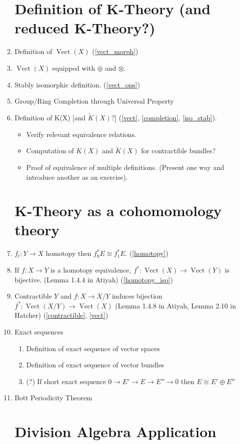\documentclass[12]{amsart}
\DeclareMathOperator{\vect}{Vect}
\begin{document}
\begin{enumerate}
    \section{Definition of K-Theory (and reduced K-Theory?)} %
    \item Definition of $\vect(X)$ (\ref{vect_morph}) \label{vect}
    \item $\vect(X)$ equipped with $\oplus$ and $\otimes$. \label{vect_ops} 
    \item Stably isomorphic definition. (\ref{vect_ops}) $\label{iso_stab}$
    \item Group/Ring Completion through Universal Property \label{completion}
    \item Definition of K(X) [and $\tilde{K}(X)$?] (\ref{vect}, \ref{completion}, \ref{iso_stab}).
    \begin{itemize}
        \item Verify relevant equivalence relations.
        \item Computation of $K(X)$ and $\tilde{K}(X)$ for contractible bundles?
        \item Proof of equivalence of multiple definitions. (Present one way and introduce another as an exercise).
    \end{itemize}

\section{K-Theory as a cohomomology theory}
    \item $f_t: Y \to X$ homotopy then $f_0^*E \cong f_1^*E$. \label{homotopy_iso} (\ref{homotopy})
    \item If $f: X \to Y$ is a homotopy equivalence, $f^*: \vect(X) \to \vect(Y)$ is bijective. (Lemma 1.4.4 in Atiyah) (\ref{homotopy_iso})
    \item Contractible $Y$ and $f: X \to X/Y$ induces bijection $f^*: \vect(X/Y) \to \vect(X)$ (Lemma 1.4.8 in Atiyah, Lemma 2.10 in Hatcher) (\ref{contractible}, \ref{vect})
    \item Exact sequences
    \begin{enumerate}
        \item Definition of exact sequence of vector spaces
        \item Definition of exact sequence of vector bundles
        \item (?) If short exact sequence $0 \to E' \to E \to E'' \to 0$ then $E \cong E' \oplus E''$
    \end{enumerate}
    \item Bott Periodicity Theorem

\section{Division Algebra Application} %

\end{enumerate}
\end{document}
